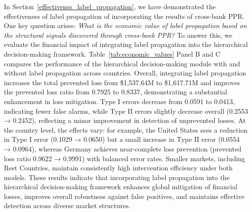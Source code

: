 \documentclass[11pt,english]{article}
\begin{document}
In Section~\ref{effectivenss_label_propagation}, we have demonstrated the effectiveness of label propagation of incorporating the results of cross-bank PPR. One key question arises: \textit{What is the economic value of label propagation based on the structural signals discovered through cross-bank PPR?} To answer this, we evaluate the financial impact of integrating label propagation into the hierarchical decision-making framework. Table~\ref{tab:economic_values} Panel B and C compares the performance of the hierarchical decision-making module with and without label propagation across countries. Overall, integrating label propagation increases the total prevented loss from \$1,537.64M to \$1,617.71M and improves the prevented loss ratio from 0.7925 to 0.8337, demonstrating a substantial enhancement in loss mitigation. Type I errors decrease from 0.0591 to 0.0413, indicating fewer false alarms, while Type II errors slightly decrease overall (0.2553 → 0.2452), reflecting a minor improvement in detection of unprevented losses. At the country level, the effects vary: for example, the United States sees a reduction in Type I error (0.1029 → 0.0650) but a small increase in Type II error (0.0554 → 0.0964), whereas Germany achieves near-complete loss prevention (prevented loss ratio 0.9622 → 0.9991) with balanced error rates. Smaller markets, including Rest Countries, maintain consistently high intervention efficiency under both models. These results indicate that incorporating label propagation into the hierarchical decision-making framework enhances global mitigation of financial losses, improves overall robustness against false positives, and maintains effective detection across diverse market structures.
\end{document}
